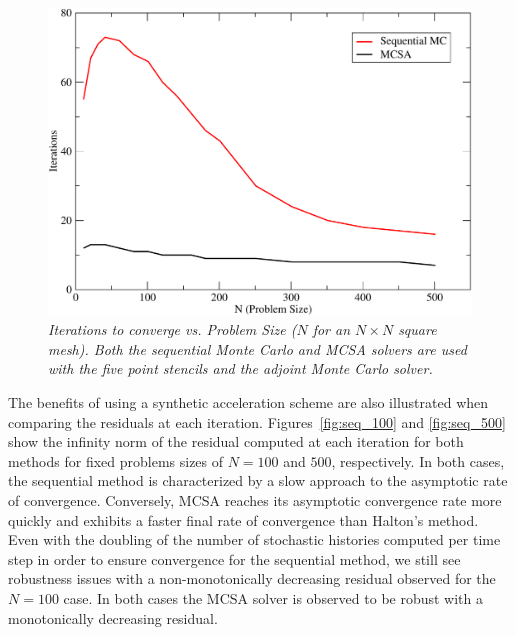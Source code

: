 \documentclass[preprint,12pt]{elsarticle}
\begin{document}
\begin{figure}[ht!]
  \centering
  \includegraphics[width=5in,clip]{seq_iterations.pdf}
  \caption{\sl Iterations to converge vs. Problem Size ($N$ for an $N
    \times N$ square mesh). Both the sequential Monte Carlo and MCSA
    solvers are used with the five point stencils and the adjoint
    Monte Carlo solver.}
  \label{fig:seq_iterations}
\end{figure}

The benefits of using a synthetic acceleration scheme are also illustrated
when comparing the residuals at each iteration.  Figures~\ref{fig:seq_100} and
\ref{fig:seq_500} show the infinity norm of the residual computed at each
iteration for both methods for fixed problems sizes of $N=100$ and $500$,
respectively.  In both cases, the sequential method is characterized by a slow
approach to the asymptotic rate of convergence.  Conversely, MCSA reaches its
asymptotic convergence rate more quickly and exhibits a faster final rate of
convergence than Halton's method. Even with the doubling of the number of
stochastic histories computed per time step in order to ensure convergence for
the sequential method, we still see robustness issues with a non-monotonically
decreasing residual observed for the $N=100$ case. In both cases the MCSA
solver is observed to be robust with a monotonically decreasing residual.
\end{document}
